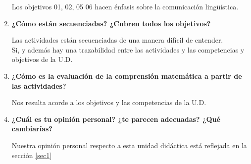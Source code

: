 \begin{enumerate}
Los objetivos 01, 02, 05 06 hacen énfasis sobre la comunicación lingüística.

\item \textbf{¿Cómo están secuenciadas? ¿Cubren todos los objetivos?}

Las actividades están secuenciadas de una manera difícil de entender.\\
Si, y además hay una trazabilidad entre las actividades y las competencias y objetivos de la U.D.

\item \textbf{¿Cómo es la evaluación de la comprensión matemática a partir de las actividades?}


Nos resulta acorde a los objetivos y las competencias de la U.D.

\item \textbf{¿Cuál es tu opinión personal? ¿te parecen adecuadas? ¿Qué cambiarías?}

Nuestra opinión personal respecto a esta unidad didáctica está reflejada en la sección \ref{sec1}

\end{enumerate}


